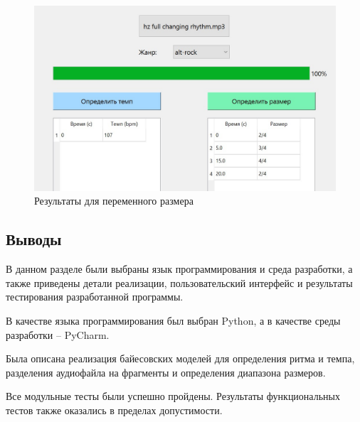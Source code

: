 \begin{figure}[h]
	\centering
	\includegraphics[scale=0.85]{inc/img/test_rhythm.jpg}
	\caption{Результаты для переменного размера}
	\label{img:test_rhythm}
\end{figure}

\clearpage

\subsection*{Выводы}

В данном разделе были выбраны язык программирования и среда разработки, а также приведены детали реализации, пользовательский интерфейс и результаты тестирования разработанной программы.

В качестве языка программирования был выбран Python, а в качестве среды разработки -- PyCharm.

Была описана реализация байесовских моделей для определения ритма и темпа, разделения аудиофайла на фрагменты и определения диапазона размеров.

Все модульные тесты были успешно пройдены. Результаты функциональных тестов также оказались в пределах допустимости.
